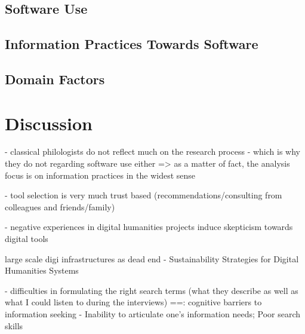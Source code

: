 \documentclass[12pt,a4paper,titlepage,oneside,abstract=true,toc=listof,toc=bibliography]{scrreprt}
\begin{document}
% 

\section{Software Use}



\section{Information Practices Towards Software}
% 
% 

\section{Domain Factors}






\chapter{Discussion}

- classical philologists do not reflect much on the research process - which is why they do not regarding software use either => as a matter of fact, the analysis focus is on information practices in the widest sense


- tool selection is very much trust based (recommendations/consulting from colleagues and friends/family)

- negative experiences in digital humanities projects induce skepticism towards digital tools

\cite{Zundert2012} large scale digi infrastructures as dead end
\cite{Neuefeind2020} - Sustainability Strategies for Digital Humanities Systems

- difficulties in formulating the right search terms (what they describe as well as what I could listen to during the interviews)
==\cite{Savolainen2015a}: cognitive barriers to information seeking - Inability to articulate one’s information needs; Poor search skills
\end{document}
